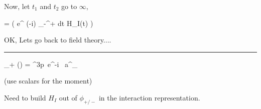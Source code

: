 {Now, let $t_1$ and $t_2$ go to $\infty$,


\be
{} = \top\left( e^{ (-i) \int_{-\infty}^{+\infty} dt H_I(t)} \right)
\ee

OK, Lets go back to field theory....

\noindent\rule{\textwidth}{1pt}

\be
\phi_+ () = \int {}^3p\ e^{-i  }\ a^{\dagger}_{}
\ee

(use scalars for the moment) 

Need to build $H_I$ out of $\phi_{+/-}$ in the interaction representation.




}



